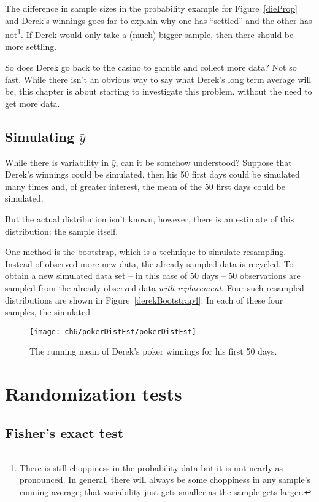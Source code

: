 The difference in sample sizes in the probability example for Figure~\ref{dieProp} and Derek's winnings goes far to explain why one has ``settled'' and the other has not\footnote{There is still choppiness in the probability  data but it is not nearly as pronounced. In general, there will always be some choppiness in any sample's running average; that variability just gets smaller as the sample gets larger.}. If Derek would only take a (much) bigger sample, then there should be more settling.

So does Derek go back to the casino to gamble and collect more data? Not so fast. While there isn't an obvious way to say what Derek's long term average will be, this chapter is about starting to investigate this problem, without the need to get more data.

\subsection{Simulating $\bar{y}$}

While there is variability in $\bar{y}$, can it be somehow understood? Suppose that Derek's winnings could be simulated, then his 50 first days could be simulated many times and, of greater interest, the mean of the 50 first days could be simulated.

But the actual distribution isn't known, however, there is an estimate of this distribution: the sample itself.

One method is the bootstrap, which is a technique to simulate resampling. Instead of observed more new data, the already sampled data is recycled. To obtain a new simulated data set -- in this case of 50 days -- 50 observations are sampled from the already observed data \emph{with replacement}. Four such resampled distributions are shown in Figure~\ref{derekBootstrap4}. In each of these four samples, the simulated

\begin{figure}
\centering
\texttt{[image: ch6/pokerDistEst/pokerDistEst]}
\caption{The running mean of Derek's poker winnings for his first 50 days.}
\label{pokerDistEst}
\end{figure}

\section{Randomization tests}
\subsection{Fisher's exact test}
\label{fisherTest}
